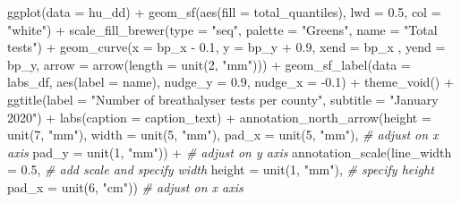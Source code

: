 \documentclass[
]{book}
\newenvironment{Shaded}{\begin{snugshade}}{\end{snugshade}}
\newcommand{\AttributeTok}[1]{\textcolor[rgb]{0.77,0.63,0.00}{#1}}
\newcommand{\CommentTok}[1]{\textcolor[rgb]{0.56,0.35,0.01}{\textit{#1}}}
\newcommand{\DecValTok}[1]{\textcolor[rgb]{0.00,0.00,0.81}{#1}}
\newcommand{\FloatTok}[1]{\textcolor[rgb]{0.00,0.00,0.81}{#1}}
\newcommand{\FunctionTok}[1]{\textcolor[rgb]{0.00,0.00,0.00}{#1}}
\newcommand{\NormalTok}[1]{#1}
\newcommand{\SpecialCharTok}[1]{\textcolor[rgb]{0.00,0.00,0.00}{#1}}
\newcommand{\StringTok}[1]{\textcolor[rgb]{0.31,0.60,0.02}{#1}}
\begin{document}
\begin{Shaded}
\begin{Highlighting}[]
\FunctionTok{ggplot}\NormalTok{(}\AttributeTok{data =}\NormalTok{ hu\_dd) }\SpecialCharTok{+} 
  \FunctionTok{geom\_sf}\NormalTok{(}\FunctionTok{aes}\NormalTok{(}\AttributeTok{fill =}\NormalTok{ total\_quantiles), }
          \AttributeTok{lwd =} \FloatTok{0.5}\NormalTok{, }\AttributeTok{col =} \StringTok{"white"}\NormalTok{) }\SpecialCharTok{+} 
  \FunctionTok{scale\_fill\_brewer}\NormalTok{(}\AttributeTok{type =} \StringTok{"seq"}\NormalTok{, }
                    \AttributeTok{palette =} \StringTok{"Greens"}\NormalTok{, }
                    \AttributeTok{name =} \StringTok{"Total tests"}\NormalTok{) }\SpecialCharTok{+} 
  \FunctionTok{geom\_curve}\NormalTok{(}\AttributeTok{x =}\NormalTok{ bp\_x }\SpecialCharTok{{-}} \FloatTok{0.1}\NormalTok{, }
             \AttributeTok{y =}\NormalTok{ bp\_y }\SpecialCharTok{+} \FloatTok{0.9}\NormalTok{, }
             \AttributeTok{xend =}\NormalTok{ bp\_x , }
             \AttributeTok{yend =}\NormalTok{ bp\_y, }
             \AttributeTok{arrow =} \FunctionTok{arrow}\NormalTok{(}\AttributeTok{length =} \FunctionTok{unit}\NormalTok{(}\DecValTok{2}\NormalTok{, }\StringTok{"mm"}\NormalTok{))) }\SpecialCharTok{+}
  \FunctionTok{geom\_sf\_label}\NormalTok{(}\AttributeTok{data =}\NormalTok{ labs\_df, }
                \FunctionTok{aes}\NormalTok{(}\AttributeTok{label =}\NormalTok{ name), }
                \AttributeTok{nudge\_y =} \FloatTok{0.9}\NormalTok{, }
                \AttributeTok{nudge\_x =} \SpecialCharTok{{-}}\FloatTok{0.1}\NormalTok{) }\SpecialCharTok{+} 
  \FunctionTok{theme\_void}\NormalTok{() }\SpecialCharTok{+} 
  \FunctionTok{ggtitle}\NormalTok{(}\AttributeTok{label =} \StringTok{"Number of breathalyser tests per county"}\NormalTok{, }
          \AttributeTok{subtitle =} \StringTok{"January 2020"}\NormalTok{) }\SpecialCharTok{+} 
  \FunctionTok{labs}\NormalTok{(}\AttributeTok{caption =}\NormalTok{ caption\_text) }\SpecialCharTok{+} 
  \FunctionTok{annotation\_north\_arrow}\NormalTok{(}\AttributeTok{height =} \FunctionTok{unit}\NormalTok{(}\DecValTok{7}\NormalTok{, }\StringTok{"mm"}\NormalTok{), }
                         \AttributeTok{width =} \FunctionTok{unit}\NormalTok{(}\DecValTok{5}\NormalTok{, }\StringTok{"mm"}\NormalTok{), }
                         \AttributeTok{pad\_x =} \FunctionTok{unit}\NormalTok{(}\DecValTok{5}\NormalTok{, }\StringTok{"mm"}\NormalTok{),   }\CommentTok{\# adjust on x axis}
                         \AttributeTok{pad\_y =} \FunctionTok{unit}\NormalTok{(}\DecValTok{1}\NormalTok{, }\StringTok{"mm"}\NormalTok{)) }\SpecialCharTok{+} \CommentTok{\# adjust on y axis}
  \FunctionTok{annotation\_scale}\NormalTok{(}\AttributeTok{line\_width =} \FloatTok{0.5}\NormalTok{,      }\CommentTok{\# add scale and specify width}
                   \AttributeTok{height =} \FunctionTok{unit}\NormalTok{(}\DecValTok{1}\NormalTok{, }\StringTok{"mm"}\NormalTok{), }\CommentTok{\# specify height}
                   \AttributeTok{pad\_x =} \FunctionTok{unit}\NormalTok{(}\DecValTok{6}\NormalTok{, }\StringTok{"cm"}\NormalTok{))  }\CommentTok{\# adjust on x axis}
\end{Highlighting}
\end{Shaded}
\end{document}
